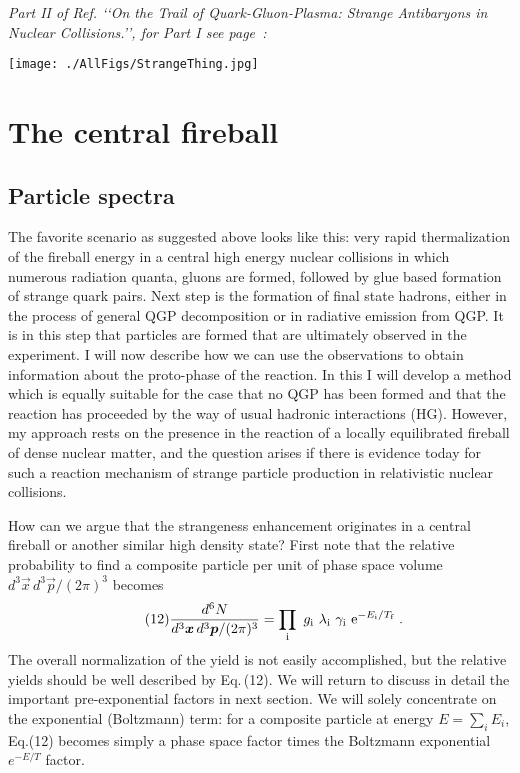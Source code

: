 \noindent\textit{Part II of Ref.\cite{Rafelski:1992td} \lq\lq On the Trail of Quark-Gluon-Plasma: Strange Antibaryons in Nuclear Collisions.\rq\rq, for Part I see page~\pageref{Trail1992}:}\\[-0.7cm]
%
\begin{mdframed}[linecolor=gray,roundcorner=12pt,backgroundcolor=Dandelion!15,linewidth=1pt,leftmargin=0cm,rightmargin=0cm,topline=true,bottomline=true,skipabove=12pt]\relax%
%
\centerline{\texttt{[image: ./AllFigs/StrangeThing.jpg]}}
{}
%
%
\section*{The central fireball}
\subsection*{Particle spectra}
\label{Trail1992p2}
The favorite scenario as suggested above looks like this: very rapid thermalization of the fireball energy in a central high energy nuclear collisions in which numerous radiation quanta, gluons are formed, followed by glue based formation of strange quark pairs. Next step is the formation of final state hadrons, either in the process of general QGP decomposition or in radiative emission from QGP. It is in this step that particles are formed that are ultimately observed in the experiment. I will now describe how we can use the observations to obtain information about the proto-phase of the reaction. In this I will develop a method which is equally suitable for the case that no QGP has been formed and that the reaction has proceeded by the way of usual hadronic interactions (HG). However, my approach rests on the presence in the reaction of a locally equilibrated fireball of dense nuclear matter, and the question arises if there is evidence today for such a reaction mechanism of strange particle production in relativistic nuclear collisions.
 
How can we argue that the strangeness enhancement originates in a central fireball or another similar high density state? First note that the relative probability to find a composite particle per unit of phase space volume $d^3\vec x \, d^3\vec p/(2\pi)^3$ becomes 
\begin{equation} 
\tag{12} \frac{d^6N}{d^3\vec x \, d^3\vec p /(2\pi)^3}= \prod_{\rm i}
~g_{\rm i}\ \lambda_{\rm i} \ \gamma_{\rm i} \ 
{\rm e}^{-E_{\rm i}/T_{\rm f}} \;.
\end{equation}
The overall normalization of the yield is not easily accomplished, but the relative yields should be well described by Eq.\,(12). We will return to discuss in detail the important pre-exponential factors in next section. We will solely concentrate on the exponential (Boltzmann) term: for a composite particle at energy $E=\sum_i E_i$, Eq.(12) becomes simply a phase space factor times the Boltzmann exponential $e^{-E/T}$ factor.
 

\end{mdframed}
